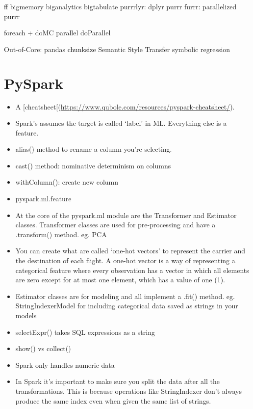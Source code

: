 \documentclass[]{book}
\begin{document}
ff \textbar{} bigmemory \textbar{} biganalytics \textbar{} bigtabulate
\textbar{} purrrlyr: dplyr purrr \textbar{} furrr: parallelized purrr

foreach + doMC \textbar{} parallel \textbar{} doParallel

Out-of-Core: pandas chunksize Semantic Style Transfer symbolic
regression

\section{PySpark}\label{pyspark}

\begin{itemize}
\item
  A
  {[}cheatsheet{[}(\url{https://www.qubole.com/resources/pyspark-cheatsheet/}).
\item
  Spark's assumes the target is called `label' in ML. Everything else is
  a feature.
\item
  alias() method to rename a column you're selecting.
\item
  cast() method: nominative determinism on columns
\item
  withColumn(): create new column
\item
  pyspark.ml.feature
\item
  At the core of the pyspark.ml module are the Transformer and Estimator
  classes. Transformer classes are used for pre-processing and have a
  .transform() method. eg. PCA
\item
  You can create what are called `one-hot vectors' to represent the
  carrier and the destination of each flight. A one-hot vector is a way
  of representing a categorical feature where every observation has a
  vector in which all elements are zero except for at most one element,
  which has a value of one (1).
\item
  Estimator classes are for modeling and all implement a .fit() method.
  eg. StringIndexerModel for including categorical data saved as strings
  in your models
\item
  selectExpr() takes SQL expressions as a string
\item
  show() vs collect()
\item
  Spark only handles numeric data
\item
  In Spark it's important to make sure you split the data after all the
  transformations. This is because operations like StringIndexer don't
  always produce the same index even when given the same list of
  strings.
\end{itemize}
\end{document}
